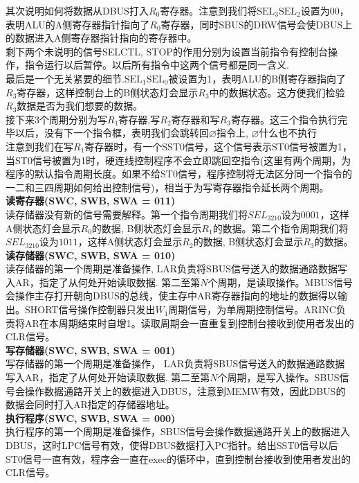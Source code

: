 \documentclass[UTF8]{ctexart}
\begin{document}
\indent 其次说明如何将数据从DBUS打入$R_0$寄存器。注意到我们将$\text{SEL}_{3}\text{SEL}_{2}$设置为00，表明ALU的A侧寄存器指针指向了$R_0$寄存器，同时SBUS的DRW信号会使DBUS上的数据进入A侧寄存器指针指向的寄存器中。\\
剩下两个未说明的信号SELCTL, STOP的作用分别为设置当前指令有控制台操作，指令运行以后暂停。以后所有指令中这两个信号都是同一含义.\\
\indent 最后是一个无关紧要的细节.$\text{SEL}_{1}\text{SEL}_{0}$被设置为1，表明ALU的B侧寄存器指向了$R_3$寄存器，这样控制台上的B侧状态灯会显示$R_3$中的数据状态。这方便我们检验$R_3$数据是否为我们想要的数据。\\
\indent 接下来3个周期分别为写$R_1$寄存器,写$R_2$寄存器和写$R_3$寄存器。这三个指令执行完毕以后，没有下一个指令框，表明我们会跳转回$\varnothing$指令上, $\varnothing$什么也不执行\\
\indent 注意到我们在写$R_1$寄存器时，有一个SST0信号，这个信号表示ST0信号被置为1，当ST0信号被置为1时，硬连线控制程序不会立即跳回空指令(这里有两个周期，为程序的默认指令周期长度。如果不给ST0信号，程序控制将无法区分同一个指令的一二和三四周期如何给出控制信号)，相当于为写寄存器指令延长两个周期。\\
{\bfseries 读寄存器(SWC, SWB, SWA = 011)}\\
\indent 读存储器没有新的信号需要解释。第一个指令周期我们将$SEL_{3210}$设为$0001$，这样A侧状态灯会显示$R_0$的数据, B侧状态灯会显示$R_1$的数据。第二个指令周期我们将$SEL_{3210}$设为$1011$，这样A侧状态灯会显示$R_2$的数据, B侧状态灯会显示$R_3$的数据。\\
{\bfseries 读存储器(SWC, SWB, SWA = 010)}\\
\indent 读存储器的第一个周期是准备操作, LAR负责将SBUS信号送入的数据通路数据写入AR，指定了从何处开始读取数据. 第二至第$N$个周期，是读取操作。MBUS信号会操作主存打开朝向DBUS的总线，使主存中AR寄存器指向的地址的数据得以输出。SHORT信号操作控制器只发出$W_1$周期信号，为单周期控制信号。ARINC负责将AR在本周期结束时自增1。读取周期会一直重复到控制台接收到使用者发出的CLR信号。\\
{\bfseries 写存储器(SWC, SWB, SWA = 001)}\\
\indent 写存储器的第一个周期是准备操作， LAR负责将SBUS信号送入的数据通路数据写入AR，指定了从何处开始读取数据. 第二至第$N$个周期，是写入操作。SBUS信号会操作数据通路开关上的数据进入DBUS，注意到MEMW有效，因此DBUS的数据会同时打入AR指定的存储器地址。\\
{\bfseries 执行程序(SWC, SWB, SWA = 000)}\\
\indent 执行程序的第一个周期是准备操作，SBUS信号会操作数据通路开关上的数据进入DBUS，这时LPC信号有效，使得DBUS数据打入PC指针。给出SST0信号以后ST0信号一直有效，程序会一直在exec的循环中，直到控制台接收到使用者发出的CLR信号。
\end{document}
